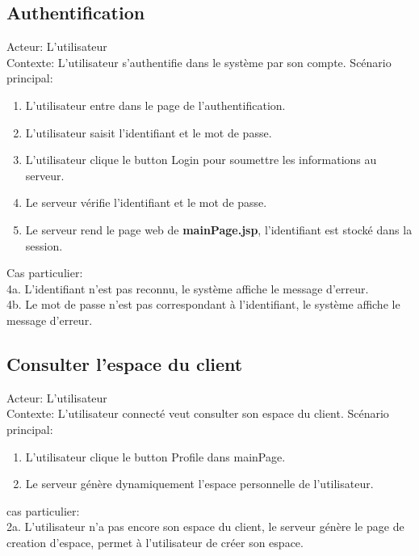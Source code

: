 \documentclass[14px]{article}
\begin{document}
\subsection{Authentification}
Acteur: L'utilisateur\\
Contexte: L'utilisateur s'authentifie dans le système par son compte.
Scénario principal:
\begin{enumerate}
	\item L'utilisateur entre dans le page de l'authentification.
	\item L'utilisateur saisit l'identifiant et le mot de passe.
	\item L'utilisateur clique le button Login pour soumettre les informations au serveur.
	\item Le serveur vérifie l'identifiant et le mot de passe.
	\item Le serveur rend le page web de \textbf{mainPage.jsp}, l'identifiant est stocké dans la session.
\end{enumerate}
Cas particulier: \\
4a. L'identifiant n'est pas reconnu, le système affiche le message d'erreur.\\
4b. Le mot de passe n'est pas correspondant à l'identifiant, le système affiche le message d'erreur.

\subsection{Consulter l'espace du client}
Acteur: L'utilisateur\\
Contexte: L'utilisateur connecté veut consulter son espace du client.
Scénario principal:
\begin{enumerate}
	\item L'utilisateur clique le button Profile dans mainPage.
	\item Le serveur génère dynamiquement l'espace personnelle de l'utilisateur.
\end{enumerate}
cas particulier:\\
2a. L'utilisateur n'a pas encore son espace du client, le serveur génère le page de creation d'espace, permet à l'utilisateur de créer son espace.
\end{document}
